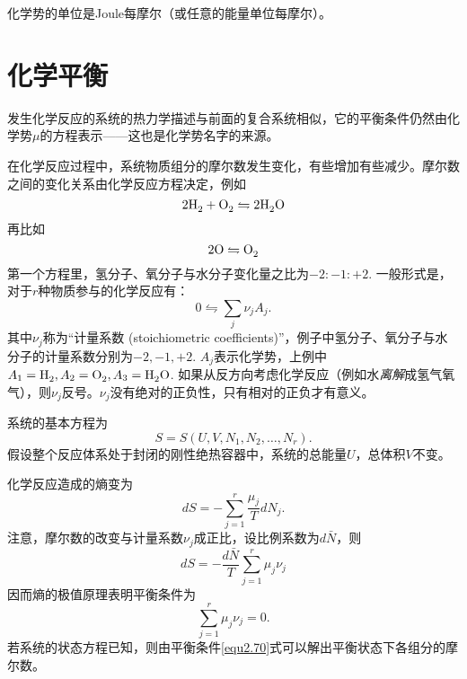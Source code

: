 化学势的单位是Joule每摩尔（或任意的能量单位每摩尔）。


\section{化学平衡}
\label{sec2.9}
发生化学反应的系统的热力学描述与前面的复合系统相似，它的平衡条件仍然由化学势$\mu$的方程表示——这也是化学势名字的来源。

在化学反应过程中，系统物质组分的摩尔数发生变化，有些增加有些减少。摩尔数之间的变化关系由化学反应方程决定，例如
\begin{equation}
	2\ce{H2} + \ce{O2} \leftrightharpoons 2 \ce{H2O}
\label{equ2.64}
\end{equation}
再比如
\begin{equation}
	2\ce{O} \leftrightharpoons \ce{O2}
\label{equ2.65}
\end{equation}
第一个方程里，氢分子、氧分子与水分子变化量之比为$-2 : -1 : +2$. 一般形式是，对于$r$种物质参与的化学反应有：
\begin{equation}
	0 \leftrightharpoons \sum_j \nu_j A_j.
\end{equation}
其中$\nu_j$称为“计量系数 (stoichiometric coefficients)”，例子中氢分子、氧分子与水分子的计量系数分别为$-2, -1, +2$. $A_j$表示化学势，上例中$A_1 = \ce{H2}, A_2 = \ce{O2}, A_3 = \ce{H2O}$. 如果从反方向考虑化学反应（例如水{\it 离解}成氢气氧气），则$\nu_j$反号。$\nu_j$没有绝对的正负性，只有相对的正负才有意义。

系统的基本方程为
\begin{equation}
	S = S(U, V, N_1, N_2, \dots, N_r).
\label{equ2.67}
\end{equation}
假设整个反应体系处于封闭的刚性绝热容器中，系统的总能量$U$，总体积$V$不变。

化学反应造成的熵变为
\begin{equation}
	dS = - \sum_{j = 1}^{r} \frac{\mu_j}{T} dN_j.
\label{equ2.68}
\end{equation}
注意，摩尔数的改变与计量系数$\nu_j$成正比，设比例系数为$d\bar{N}$，则
\begin{equation}
	dS = -\frac{d\bar{N}}{T} \sum_{j = 1}^r \mu_j \nu_j
\label{equ2.69}
\end{equation}
因而熵的极值原理表明平衡条件为
\begin{equation}
	\sum_{j = 1}^r \mu_j \nu_j = 0.
\label{equ2.70}
\end{equation}
若系统的状态方程已知，则由平衡条件\eqref{equ2.70}式可以解出平衡状态下各组分的摩尔数。

